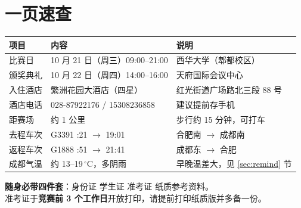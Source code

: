 \documentclass[11pt,a4paper,fontset=windows]{ctexart}
\newcommand{\thd}[1]{\textbf{\color{main}#1}}   %
\newcommand{\warnmark}{\textcolor{accent}{\rule[0.12em]{0.52em}{0.52em}}}  %
\begin{document}
\section{一页速查}


\vspace{0.8em}
\begin{center}
\begin{tabularx}{\textwidth}{@{}L{3.1cm}L{5.4cm}X@{}}
\toprule
\thd{项目} & \thd{内容} & \thd{说明}\\
\midrule
比赛日 & 10 月 21 日（周三）09:00--21:00 & 西华大学（郫都校区）\\
颁奖典礼 & 10 月 22 日（周四）14:00--16:00 & 天府国际会议中心\\
入住酒店 & 繁洲花园大酒店（四星） & 红光街道广场路北三段 88 号\\
酒店电话 & 028-87922176 / 15308236858 & 建议提前存手机\\
距赛场 & 约 1 公里 & 步行约 15 分钟，可打车\\
去程车次 & G3391 :21 $\rightarrow$ 19:01 & 合肥南 $\rightarrow$ 成都南\\
返程车次 & G1888 :51 $\rightarrow$ 21:41 & 成都东 $\rightarrow$ 合肥\\
成都气温 & 约 13--19\,$^\circ$C{}，多阴雨 & 早晚温差大，见 \ref{sec:remind} 节\\
\bottomrule
\end{tabularx}
\end{center}

\begin{okbox}
\textbf{随身必带四件套}：身份证 \quad 学生证 \quad 准考证 \quad 纸质参考资料。\\
准考证于\textbf{竞赛前 3 个工作日}开放打印，请提前打印纸质版并多备一份。
\end{okbox}
\end{document}
